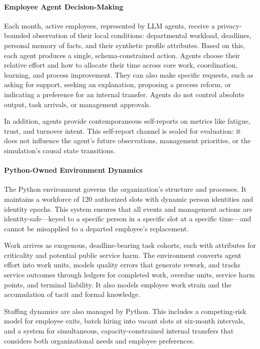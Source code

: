 \documentclass{article}
\begin{document}
\paragraph{Employee Agent Decision-Making}
Each month, active employees, represented by LLM agents, receive a privacy-bounded observation of their local conditions: departmental workload, deadlines, personal memory of facts, and their synthetic profile attributes. Based on this, each agent produces a single, schema-constrained action. Agents choose their relative effort and how to allocate their time across core work, coordination, learning, and process improvement. They can also make specific requests, such as asking for support, seeking an explanation, proposing a process reform, or indicating a preference for an internal transfer. Agents do not control absolute output, task arrivals, or management approvals.

In addition, agents provide contemporaneous self-reports on metrics like fatigue, trust, and turnover intent. This self-report channel is sealed for evaluation: it does not influence the agent's future observations, management priorities, or the simulation's causal state transitions.

\paragraph{Python-Owned Environment Dynamics}
The Python environment governs the organization's structure and processes. It maintains a workforce of 120 authorized slots with dynamic person identities and identity epochs. This system ensures that all events and management actions are identity-safe---keyed to a specific person in a specific slot at a specific time---and cannot be misapplied to a departed employee's replacement.

Work arrives as exogenous, deadline-bearing task cohorts, each with attributes for criticality and potential public service harm. The environment converts agent effort into work units, models quality errors that generate rework, and tracks service outcomes through ledgers for completed work, overdue units, service harm points, and terminal liability. It also models employee work strain and the accumulation of tacit and formal knowledge.

Staffing dynamics are also managed by Python. This includes a competing-risk model for employee exits, batch hiring into vacant slots at six-month intervals, and a system for simultaneous, capacity-constrained internal transfers that considers both organizational needs and employee preferences.
\end{document}
